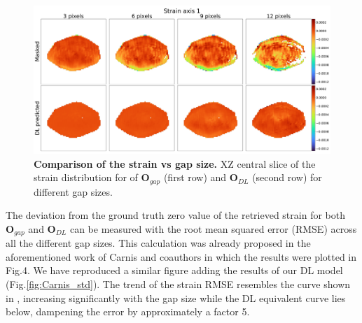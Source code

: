 \begin{figure}[H]
    \centering
    \includegraphics[width=\textwidth]{figures/Inpainting/strain_comparison_allGaps.pdf}
    \caption{\textbf{Comparison of the strain vs gap size.} XZ central slice of the strain distribution for of $\textbf{O}_{gap}$
    (first row) and $\textbf{O}_{DL}$ (second row) for different gap sizes.}
    \label{fig:Carnis_allgaps_strain}
\end{figure}

The deviation from the ground truth zero value of the retrieved strain for both $\mathbf{O}_{gap}$ and $\mathbf{O}_{DL}$
can be measured with the root mean squared error (RMSE) across all the different gap sizes. This calculation was already
proposed in the aforementioned work of Carnis and coauthors in which the results were plotted in Fig.4. We have reproduced
a similar figure adding the results of our DL model (Fig.\ref{fig:Carnis_std}). The trend of the strain RMSE 
resembles the curve shown in \cite{carnis_towards_2019}, increasing significantly with the gap size 
while the DL equivalent curve lies below, dampening the error by approximately a factor 5. 

